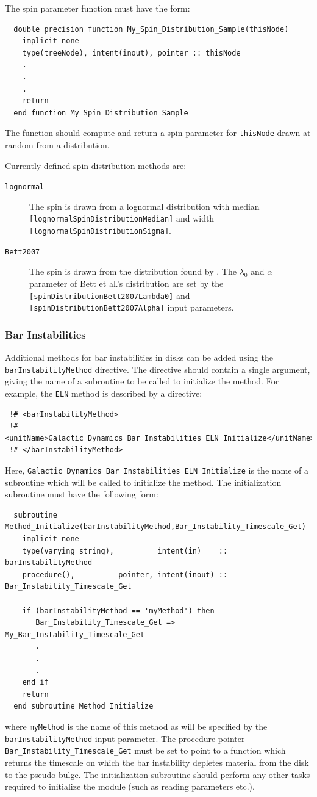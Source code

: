 The spin parameter function must have the form:
\begin{verbatim}
  double precision function My_Spin_Distribution_Sample(thisNode)
    implicit none
    type(treeNode), intent(inout), pointer :: thisNode
    .
    .
    .
    return
  end function My_Spin_Distribution_Sample
\end{verbatim}
The function should compute and return a spin parameter for {\tt thisNode} drawn at random from a distribution.

Currently defined spin distribution methods are:
\begin{description}
 \item [{\tt lognormal}] The spin is drawn from a lognormal distribution with median {\tt [lognormalSpinDistributionMedian]} and width {\tt [lognormalSpinDistributionSigma]}.
 \item [{\tt Bett2007}] The spin is drawn from the distribution found by \cite{bett_spin_2007}. The $\lambda_0$ and $\alpha$ parameter of Bett et al.'s distribution are set by the {\tt [spinDistributionBett2007Lambda0]} and {\tt [spinDistributionBett2007Alpha]} input parameters.
\end{description}

\subsubsection{Bar Instabilities}

Additional methods for bar instabilities in disks can be added using the {\tt barInstabilityMethod} directive. The directive should contain a single argument, giving the name of a subroutine to be called to initialize the method. For example, the {\tt ELN} method is described by a directive:
\begin{verbatim}
 !# <barInstabilityMethod>
 !#  <unitName>Galactic_Dynamics_Bar_Instabilities_ELN_Initialize</unitName>
 !# </barInstabilityMethod>
\end{verbatim}
Here, {\tt Galactic\_Dynamics\_Bar\_Instabilities\_ELN\_Initialize} is the name of a subroutine which will be called to initialize the method. The initialization subroutine must have the following form:
\begin{verbatim}
  subroutine Method_Initialize(barInstabilityMethod,Bar_Instability_Timescale_Get)
    implicit none
    type(varying_string),          intent(in)    :: barInstabilityMethod
    procedure(),          pointer, intent(inout) :: Bar_Instability_Timescale_Get
    
    if (barInstabilityMethod == 'myMethod') then
       Bar_Instability_Timescale_Get => My_Bar_Instability_Timescale_Get
       .
       .
       .
    end if
    return
  end subroutine Method_Initialize
\end{verbatim}
where {\tt myMethod} is the name of this method as will be specified by the {\tt barInstabilityMethod} input parameter. The procedure pointer {\tt Bar\_Instability\_Timescale\_Get} must be set to point to a function which returns the timescale on which the bar instability depletes material from the disk to the pseudo-bulge. The initialization subroutine should perform any other tasks required to initialize the module (such as reading parameters etc.).

